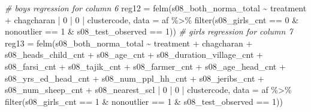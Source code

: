 \documentclass[
]{article}
\newenvironment{Shaded}{\begin{snugshade}}{\end{snugshade}}
\newcommand{\AttributeTok}[1]{\textcolor[rgb]{0.77,0.63,0.00}{#1}}
\newcommand{\CommentTok}[1]{\textcolor[rgb]{0.56,0.35,0.01}{\textit{#1}}}
\newcommand{\DecValTok}[1]{\textcolor[rgb]{0.00,0.00,0.81}{#1}}
\newcommand{\FunctionTok}[1]{\textcolor[rgb]{0.00,0.00,0.00}{#1}}
\newcommand{\NormalTok}[1]{#1}
\newcommand{\OtherTok}[1]{\textcolor[rgb]{0.56,0.35,0.01}{#1}}
\newcommand{\SpecialCharTok}[1]{\textcolor[rgb]{0.00,0.00,0.00}{#1}}
\begin{document}
\begin{Shaded}
\begin{Highlighting}[]
\CommentTok{\# boys regression for column 6}
\NormalTok{reg12 }\OtherTok{=} \FunctionTok{felm}\NormalTok{(s08\_both\_norma\_total }\SpecialCharTok{\textasciitilde{}}\NormalTok{ treatment }\SpecialCharTok{+}\NormalTok{ chagcharan }\SpecialCharTok{|} \DecValTok{0} \SpecialCharTok{|} \DecValTok{0} \SpecialCharTok{|}\NormalTok{ clustercode, }
            \AttributeTok{data =}\NormalTok{ af }\SpecialCharTok{\%\textgreater{}\%} \FunctionTok{filter}\NormalTok{(s08\_girls\_cnt }\SpecialCharTok{==} \DecValTok{0} \SpecialCharTok{\&} 
\NormalTok{                                 nonoutlier }\SpecialCharTok{==} \DecValTok{1} \SpecialCharTok{\&}
\NormalTok{                                 s08\_test\_observed }\SpecialCharTok{==} \DecValTok{1}\NormalTok{))}
\CommentTok{\# girls regression for column 7}
\NormalTok{reg13 }\OtherTok{=} \FunctionTok{felm}\NormalTok{(s08\_both\_norma\_total }\SpecialCharTok{\textasciitilde{}}\NormalTok{ treatment }\SpecialCharTok{+}\NormalTok{ chagcharan }\SpecialCharTok{+} 
\NormalTok{               s08\_heads\_child\_cnt }\SpecialCharTok{+}\NormalTok{ s08\_age\_cnt }\SpecialCharTok{+}
\NormalTok{               s08\_duration\_village\_cnt }\SpecialCharTok{+}\NormalTok{ s08\_farsi\_cnt }\SpecialCharTok{+}\NormalTok{ s08\_tajik\_cnt }\SpecialCharTok{+}
\NormalTok{               s08\_farmer\_cnt }\SpecialCharTok{+}\NormalTok{ s08\_age\_head\_cnt }\SpecialCharTok{+}\NormalTok{ s08\_yrs\_ed\_head\_cnt }\SpecialCharTok{+} 
\NormalTok{               s08\_num\_ppl\_hh\_cnt }\SpecialCharTok{+}\NormalTok{ s08\_jeribs\_cnt }\SpecialCharTok{+}\NormalTok{ s08\_num\_sheep\_cnt }\SpecialCharTok{+}
\NormalTok{               s08\_nearest\_scl }\SpecialCharTok{|} \DecValTok{0} \SpecialCharTok{|} \DecValTok{0} \SpecialCharTok{|}\NormalTok{ clustercode, }
            \AttributeTok{data =}\NormalTok{ af }\SpecialCharTok{\%\textgreater{}\%} \FunctionTok{filter}\NormalTok{(s08\_girls\_cnt }\SpecialCharTok{==} \DecValTok{1} \SpecialCharTok{\&} 
\NormalTok{                                 nonoutlier }\SpecialCharTok{==} \DecValTok{1} \SpecialCharTok{\&}
\NormalTok{                                 s08\_test\_observed }\SpecialCharTok{==} \DecValTok{1}\NormalTok{))}


\end{Highlighting}
\end{Shaded}
\end{document}
